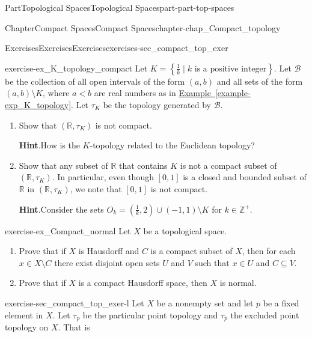\documentclass[oneside,10pt,]{book}
\newcommand{\blocktitlefont}{\relax}
\newcommand{\xreffont}{\relax}
\numberwithin{equation}{chapter}
\newcommand{\Z}{\mathbb{Z}}
\newcommand{\R}{\mathbb{R}}
\newcommand{\B}{\mathcal{B}}
\newcommand{\lt}{<}
\begin{document}
\begin{partptx}{Part}{Topological Spaces}{}{Topological Spaces}{}{}{part-part-top-spaces}
\begin{chapterptx}{Chapter}{Compact Spaces}{}{Compact Spaces}{}{}{chapter-chap_Compact_topology}
\begin{exercises-section}{Exercises}{Exercises}{}{Exercises}{}{}{exercises-sec_compact_top_exer}
\begin{divisionexercise}{9}{}{}{exercise-ex_K_topology_compact}%
Let \(K = \left\{\frac{1}{k} \mid k \text{ is a positive integer} \right\}\). Let \(\B\) be the collection of all open intervals of the form \((a,b)\) and all sets of the form \((a,b) \setminus K\), where \(a \lt b\) are real numbers as in \hyperref[example-exp_K_topology]{Example~{\xreffont\ref{example-exp_K_topology}}}. Let \(\tau_K\) be the topology generated by \(\B\).%
\begin{enumerate}[font=\bfseries,label=(\alph*),ref=\alph*]%
\item{}Show that \((\R, \tau_K)\) is not compact.%
\par\smallskip%
\noindent\textbf{\blocktitlefont Hint}.\hypertarget{hint-ex_K_topology_compact-b-b}{}\quad{}How is the \(K\)-topology related to the Euclidean topology?%
\item{}Show that any subset of \(\R\) that contains \(K\) is not a compact subset of \((\R, \tau_K)\). In particular, even though \([0,1]\) is a closed and bounded subset of \(\R\) in \((\R, \tau_K)\), we note that \([0,1]\) is not compact.%
\par\smallskip%
\noindent\textbf{\blocktitlefont Hint}.\hypertarget{hint-ex_K_topology_compact-c-b}{}\quad{}Consider the sets \(O_k = \left(\frac{1}{k},2\right) \cup (-1,1) \setminus K\) for \(k \in \Z^+\).%
\end{enumerate}%
\end{divisionexercise}%
\begin{divisionexercise}{10}{}{}{exercise-ex_Compact_normal}%
Let \(X\) be a topological space.%
\begin{enumerate}[font=\bfseries,label=(\alph*),ref=\alph*]%
\item{}Prove that if \(X\) is Hausdorff and \(C\) is a compact subset of \(X\), then for each \(x \in X \setminus C\) there exist disjoint open sets \(U\) and \(V\) such that \(x \in U\) and \(C \subseteq V\).%
\item{}Prove that if \(X\) is a compact Hausdorff space, then \(X\) is normal.%
\end{enumerate}%
\end{divisionexercise}%
\begin{divisionexercise}{11}{}{}{exercise-sec_compact_top_exer-l}%
Let \(X\) be a nonempty set and let \(p\) be a fixed element in \(X\). Let \(\tau_p\) be the particular point topology and \(\tau_{\overline{p}}\) the excluded point topology on \(X\). That is%
\begin{itemize}[label=\textbullet]

\end{itemize}
\end{divisionexercise}
\end{exercises-section}
\end{chapterptx}
\end{partptx}
\end{document}
